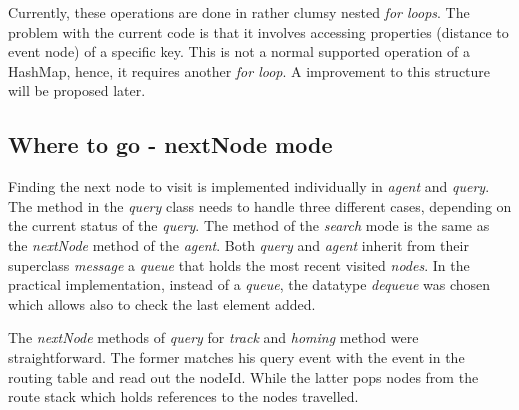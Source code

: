\documentclass[a4paper,11pt,twoside]{article}
\begin{document}
Currently, these operations are done in rather clumsy nested
\textit{for loops}. The problem with the current code is that it involves
accessing properties (distance to event node) of a specific key. This
is not a normal supported operation of a HashMap, hence, it requires
another \textit{for loop}. A improvement to this structure will be
proposed later. 


\subsection{Where to go - nextNode mode}
Finding the next node to visit is implemented individually in 
\textit{agent} and \textit{query}. The method in the \textit{query}
class needs to handle three different cases, depending on the current
status of the \textit{query}. The method of the \textit{search} mode
is the same as the \textit{nextNode} method of the
\textit{agent}. Both \textit{query} and \textit{agent} inherit from 
their superclass \textit{message} a \textit{queue} that holds the most
recent visited \textit{nodes}. In the practical implementation,
instead of a \textit{queue}, the  datatype \textit{dequeue} was chosen
which allows also to check the last element added.

The \textit{nextNode} methods of \textit{query} for \textit{track} and
\textit{homing} method were straightforward. The former matches his
query event with the event in the routing table and read out the
nodeId. While the latter pops nodes from the route stack which holds
references to the nodes travelled. 
\end{document}
